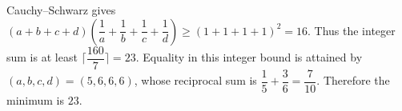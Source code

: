Cauchy--Schwarz gives $(a+b+c+d)(\dfrac{1}{a}+\dfrac{1}{b}+\dfrac{1}{c}+\dfrac{1}{d})\ge(1+1+1+1)^2=16$. Thus the integer sum is at least $\lceil\dfrac{160}{7}\rceil=23$. Equality in this integer bound is attained by $(a,b,c,d)=(5,6,6,6)$, whose reciprocal sum is $\dfrac{1}{5}+\dfrac{3}{6}=\dfrac{7}{10}$. Therefore the minimum is $\boxed{23}$.
